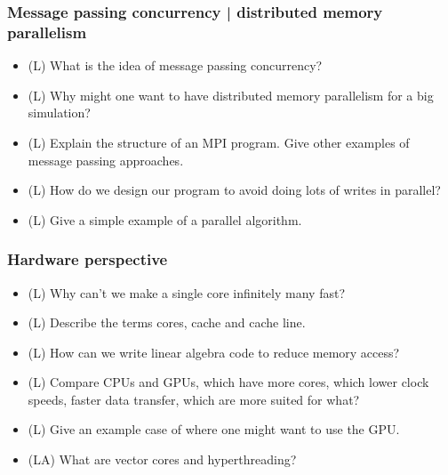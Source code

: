 \subsubsection*{Message passing concurrency | distributed memory parallelism}

\begin{itemize}
    \item (L) What is the idea of message passing concurrency?
    \answerboxS
    \item (L) Why might one want to have distributed memory parallelism for a big simulation?
    \answerboxS
    \item (L) Explain the structure of an MPI program. Give other examples of message passing approaches.
    \answerboxM
    \item (L) How do we design our program to avoid doing lots of writes in parallel?
    \answerboxS
    \item (L) Give a simple example of a parallel algorithm.
    \answerboxM
\end{itemize}

\subsubsection*{Hardware perspective}
\begin{itemize}
    \item (L) Why can't we make a single core infinitely many fast?
    \answerboxS
    \item (L) Describe the terms cores, cache and cache line.
    \answerboxS
    \item (L) How can we write linear algebra code to reduce memory access?
    \answerboxS
    \item (L) Compare CPUs and GPUs, which have more cores, which lower clock speeds, faster data transfer, which are more suited for what?
    \answerboxS
    \item (L) Give an example case of where one might want to use the GPU.
    \answerboxS
    \item (LA) What are vector cores and hyperthreading?
    \answerboxS
\end{itemize}


